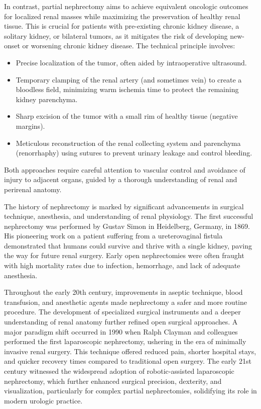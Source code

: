 In contrast, partial nephrectomy aims to achieve equivalent oncologic outcomes for localized renal masses while maximizing the preservation of healthy renal tissue. This is crucial for patients with pre-existing chronic kidney disease, a solitary kidney, or bilateral tumors, as it mitigates the risk of developing new-onset or worsening chronic kidney disease. The technical principle involves:
\begin{itemize}
  \item Precise localization of the tumor, often aided by intraoperative ultrasound.
  \item Temporary clamping of the renal artery (and sometimes vein) to create a bloodless field, minimizing warm ischemia time to protect the remaining kidney parenchyma.
  \item Sharp excision of the tumor with a small rim of healthy tissue (negative margins).
  \item Meticulous reconstruction of the renal collecting system and parenchyma (renorrhaphy) using sutures to prevent urinary leakage and control bleeding.
\end{itemize}
Both approaches require careful attention to vascular control and avoidance of injury to adjacent organs, guided by a thorough understanding of renal and perirenal anatomy.

The history of nephrectomy is marked by significant advancements in surgical technique, anesthesia, and understanding of renal physiology. The first successful nephrectomy was performed by Gustav Simon in Heidelberg, Germany, in 1869. His pioneering work on a patient suffering from a ureterovaginal fistula demonstrated that humans could survive and thrive with a single kidney, paving the way for future renal surgery. Early open nephrectomies were often fraught with high mortality rates due to infection, hemorrhage, and lack of adequate anesthesia.

Throughout the early 20th century, improvements in aseptic technique, blood transfusion, and anesthetic agents made nephrectomy a safer and more routine procedure. The development of specialized surgical instruments and a deeper understanding of renal anatomy further refined open surgical approaches. A major paradigm shift occurred in 1990 when Ralph Clayman and colleagues performed the first laparoscopic nephrectomy, ushering in the era of minimally invasive renal surgery. This technique offered reduced pain, shorter hospital stays, and quicker recovery times compared to traditional open surgery. The early 21st century witnessed the widespread adoption of robotic-assisted laparoscopic nephrectomy, which further enhanced surgical precision, dexterity, and visualization, particularly for complex partial nephrectomies, solidifying its role in modern urologic practice.

